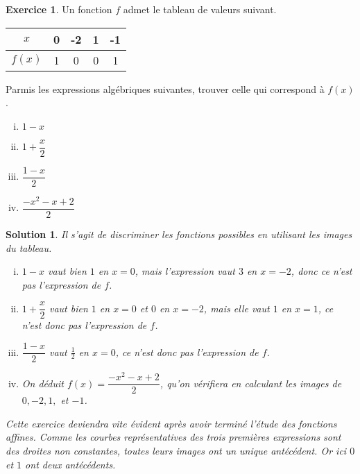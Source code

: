 \documentclass[a4paper, 14pt]{extarticle}
\theoremstyle{plain}
\newtheorem*{sol}{Solution}
\theoremstyle{definition}
\newtheorem{ex}{Exercice}
\newcommand{\exe}[2]{
		\begin{ex} #1  \end{ex}
		\begin{sol} #2 \end{sol}
	}
\newcommand{\exe}[2]{
		\begin{ex} #1  \end{ex}
	}
\begin{document}
	\exe{
		Un fonction $f$ admet le tableau de valeurs suivant.
			\begin{center}
			\begin{tabular}{|c|c|c|c|c|}\hline
				$x$ & 0 & -2 & 1 & -1 \\ \hline
				$f(x)$ & 1 & 0 & 0 & 1 \\ \hline
			\end{tabular}
			\end{center}
		Parmis les expressions algébriques suivantes, trouver celle qui correspond à $f(x)$.
			\begin{multicols}{2}
			\begin{enumerate}[i)]
				\item $1-x$
				\item $1+\dfrac{x}2$
				\item $\dfrac{1-x}2$
				\item $\dfrac{-x^2 - x + 2}2$
			\end{enumerate}
			\end{multicols}
	}{
		Il s'agit de discriminer les fonctions possibles en utilisant les images du tableau.
			\begin{enumerate}[i)]
				\item $1-x$ vaut bien $1$ en $x=0$, mais l'expression vaut $3$ en $x=-2$, donc ce n'est pas l'expression de $f$.
				\item  $1+\dfrac{x}2$ vaut bien $1$ en $x=0$ et $0$ en $x=-2$, mais elle vaut $1$ en $x=1$, ce n'est donc pas l'expression de $f$.
				\item $\dfrac{1-x}2$ vaut $\frac12$ en $x=0$, ce n'est donc pas l'expression de $f$.
				\item On déduit $f(x) = \dfrac{-x^2 - x + 2}2$, qu'on vérifiera en calculant les images de $0, -2, 1,$ et $-1$.
			\end{enumerate}
	
		Cette exercice deviendra vite évident après avoir terminé l'étude des fonctions affines. 
		Comme les courbes représentatives des trois premières expressions sont des droites non constantes, toutes leurs images ont un unique antécédent.
		Or ici $0$ et $1$ ont deux antécédents.
	}
	
\end{document}
